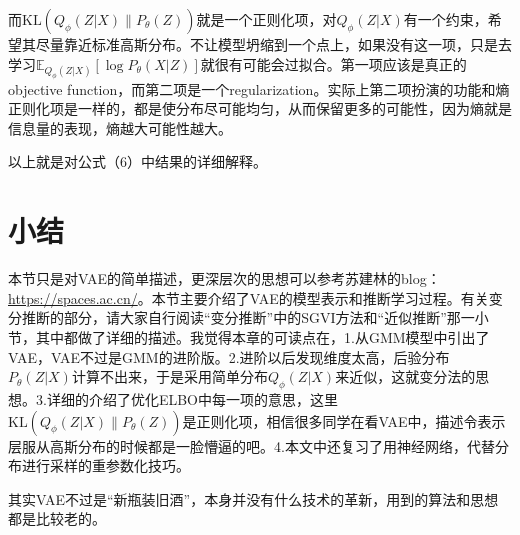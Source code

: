 \documentclass[a4paper]{article}
\begin{document}
而$\text{KL}(Q_\phi(Z|X) \|P_\theta(Z))$就是一个正则化项，对$Q_\phi(Z|X)$有一个约束，希望其尽量靠近标准高斯分布。不让模型坍缩到一个点上，如果没有这一项，只是去学习$\mathbb{E}_{Q_\phi(Z|X)}[\log P_\theta(X|Z)]$就很有可能会过拟合。第一项应该是真正的objective function，而第二项是一个regularization。实际上第二项扮演的功能和熵正则化项是一样的，都是使分布尽可能均匀，从而保留更多的可能性，因为熵就是信息量的表现，熵越大可能性越大。

以上就是对公式（6）中结果的详细解释。

\section{小结}
本节只是对VAE的简单描述，更深层次的思想可以参考苏建林的blog：\url{https://spaces.ac.cn/}。本节主要介绍了VAE的模型表示和推断学习过程。有关变分推断的部分，请大家自行阅读“变分推断”中的SGVI方法和“近似推断”那一小节，其中都做了详细的描述。我觉得本章的可读点在，1.从GMM模型中引出了VAE，VAE不过是GMM的进阶版。2.进阶以后发现维度太高，后验分布$P_\theta(Z|X)$计算不出来，于是采用简单分布$Q_\phi(Z|X)$来近似，这就变分法的思想。3.详细的介绍了优化ELBO中每一项的意思，这里$\text{KL}(Q_\phi(Z|X) \|P_\theta(Z))$是正则化项，相信很多同学在看VAE中，描述令表示层服从高斯分布的时候都是一脸懵逼的吧。4.本文中还复习了用神经网络，代替分布进行采样的重参数化技巧。

其实VAE不过是“新瓶装旧酒”，本身并没有什么技术的革新，用到的算法和思想都是比较老的。
\end{document}
